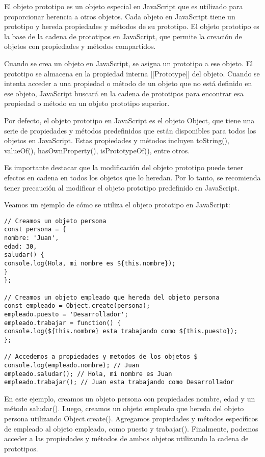 \documentclass[executivepaper]{article}
\begin{document}
El objeto prototipo es un objeto especial en JavaScript que es utilizado para proporcionar herencia a otros objetos. Cada objeto en JavaScript tiene un prototipo y hereda propiedades y métodos de su prototipo. El objeto prototipo es la base de la cadena de prototipos en JavaScript, que permite la creación de objetos con propiedades y métodos compartidos.

Cuando se crea un objeto en JavaScript, se asigna un prototipo a ese objeto. El prototipo se almacena en la propiedad interna [[Prototype]] del objeto. Cuando se intenta acceder a una propiedad o método de un objeto que no está definido en ese objeto, JavaScript buscará en la cadena de prototipos para encontrar esa propiedad o método en un objeto prototipo superior.

Por defecto, el objeto prototipo en JavaScript es el objeto Object, que tiene una serie de propiedades y métodos predefinidos que están disponibles para todos los objetos en JavaScript. Estas propiedades y métodos incluyen toString(), valueOf(), hasOwnProperty(), isPrototypeOf(), entre otros.

Es importante destacar que la modificación del objeto prototipo puede tener efectos en cadena en todos los objetos que lo heredan. Por lo tanto, se recomienda tener precaución al modificar el objeto prototipo predefinido en JavaScript.

Veamos un ejemplo de cómo se utiliza el objeto prototipo en JavaScript:

\begin{lstlisting}
// Creamos un objeto persona
const persona = {
nombre: 'Juan',
edad: 30,
saludar() {
console.log(Hola, mi nombre es ${this.nombre});
}
};

// Creamos un objeto empleado que hereda del objeto persona
const empleado = Object.create(persona);
empleado.puesto = 'Desarrollador';
empleado.trabajar = function() {
console.log(${this.nombre} esta trabajando como ${this.puesto});
};

// Accedemos a propiedades y metodos de los objetos $
console.log(empleado.nombre); // Juan
empleado.saludar(); // Hola, mi nombre es Juan
empleado.trabajar(); // Juan esta trabajando como Desarrollador
\end{lstlisting}

En este ejemplo, creamos un objeto persona con propiedades nombre, edad y un método saludar(). Luego, creamos un objeto empleado que hereda del objeto persona utilizando Object.create(). Agregamos propiedades y métodos específicos de empleado al objeto empleado, como puesto y trabajar(). Finalmente, podemos acceder a las propiedades y métodos de ambos objetos utilizando la cadena de prototipos.
\end{document}
